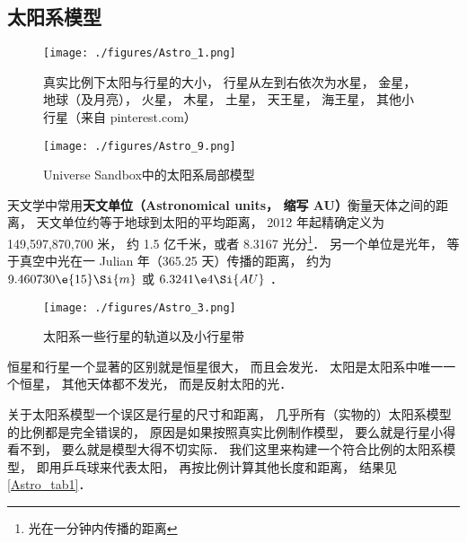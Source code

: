 
\subsection{太阳系模型}

\begin{figure}[ht]
\centering
\texttt{[image: ./figures/Astro\_1.png]}
\caption{真实比例下太阳与行星的大小， 行星从左到右依次为水星， 金星， 地球（及月亮）， 火星， 木星， 土星， 天王星， 海王星， 其他小行星（来自 pinterest.com）} \label{Astro_fig1}
\end{figure}

\begin{figure}[ht]
\centering
\texttt{[image: ./figures/Astro\_9.png]}
\caption{Universe Sandbox中的太阳系局部模型} \label{Astro_fig9}
\end{figure}

天文学中常用\textbf{天文单位（Astronomical units， 缩写 AU）}衡量天体之间的距离， 天文单位约等于地球到太阳的平均距离， 2012 年起精确定义为 149,597,870,700 米， 约 1.5 亿千米，或者 8.3167 光分\footnote{光在一分钟内传播的距离}． 另一个单位是光年， 等于真空中光在一 Julian 年（365.25 天）传播的距离， 约为 $9.460730\e{15}\Si{m}$ 或 $6.3241\e4\Si{AU}$ ．

\begin{figure}[ht]
\centering
\texttt{[image: ./figures/Astro\_3.png]}
\caption{太阳系一些行星的轨道以及小行星带} \label{Astro_fig3}
\end{figure}

恒星和行星一个显著的区别就是恒星很大， 而且会发光． 太阳是太阳系中唯一一个恒星， 其他天体都不发光， 而是反射太阳的光．

关于太阳系模型一个误区是行星的尺寸和距离， 几乎所有（实物的）太阳系模型的比例都是完全错误的， 原因是如果按照真实比例制作模型， 要么就是行星小得看不到， 要么就是模型大得不切实际． 我们这里来构建一个符合比例的太阳系模型， 即用乒乓球来代表太阳， 再按比例计算其他长度和距离， 结果见\autoref{Astro_tab1}．

